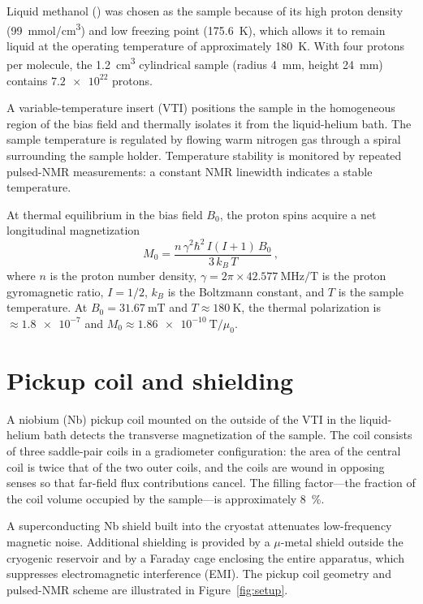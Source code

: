 Liquid methanol () was chosen as the sample because of its high proton density (\SI{99}{\mmol/\cm^3}) and low freezing point (\SI{175.6}{\kelvin}), which allows it to remain liquid at the operating temperature of approximately \SI{180}{\kelvin}. With four protons per molecule, the \SI{1.2}{\cm^3} cylindrical sample (radius \SI{4}{\mm}, height \SI{24}{\mm}) contains $\num{7.2e22}$ protons.

A variable-temperature insert (VTI) positions the sample in the homogeneous region of the bias field and thermally isolates it from the liquid-helium bath. The sample temperature is regulated by flowing warm nitrogen gas through a spiral surrounding the sample holder. Temperature stability is monitored by repeated pulsed-NMR measurements: a constant NMR linewidth indicates a stable temperature.

At thermal equilibrium in the bias field $B_0$, the proton spins acquire a net longitudinal magnetization
\begin{equation}
    M_0 = \frac{n\,\gamma^2\hbar^2\,I(I+1)\,B_0}{3\,k_B\,T}
    \,,\label{eq:M0}
\end{equation}
where $n$ is the proton number density, $\gamma = 2\pi\times\SI{42.577}{\MHz/\tesla}$ is the proton gyromagnetic ratio, $I=1/2$, $k_B$ is the Boltzmann constant, and $T$ is the sample temperature. At $B_0 = \SI{31.67}{\milli\tesla}$ and $T \approx \SI{180}{\kelvin}$, the thermal polarization is $\approx\num{1.8e-7}$ and $M_0 \approx \SI{1.86e-10}{\tesla}/\mu_0$.


\section{Pickup coil and shielding}\label{sec:apparatus:pickup}

A niobium (Nb) pickup coil mounted on the outside of the VTI in the liquid-helium bath detects the transverse magnetization of the sample. The coil consists of three saddle-pair coils in a gradiometer configuration: the area of the central coil is twice that of the two outer coils, and the coils are wound in opposing senses so that far-field flux contributions cancel. The filling factor---the fraction of the coil volume occupied by the sample---is approximately \SI{8}{\%}.

A superconducting Nb shield built into the cryostat attenuates low-frequency magnetic noise. Additional shielding is provided by a $\mu$-metal shield outside the cryogenic reservoir and by a Faraday cage enclosing the entire apparatus, which suppresses electromagnetic interference (EMI). The pickup coil geometry and pulsed-NMR scheme are illustrated in Figure~\ref{fig:setup}.

